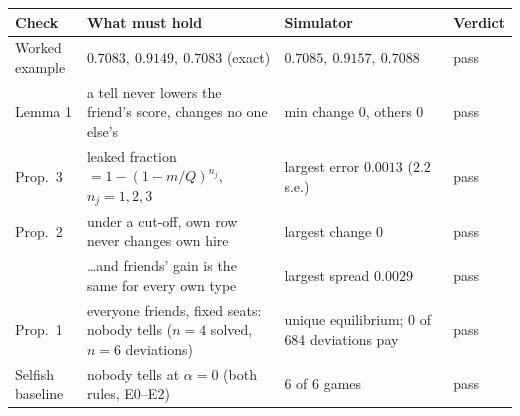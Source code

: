 \begin{tabular}{@{}llll@{}}
\toprule
Check & What must hold & Simulator & Verdict \\
\midrule
Worked example & $0.7083,\ 0.9149,\ 0.7083$ (exact) & $0.7085,\ 0.9157,\ 0.7088$ & pass \\
Lemma 1 & a tell never lowers the friend's score, changes no one else's & min change $0$, others $0$ & pass \\
Prop.\ 3 & leaked fraction $=1-(1-m/Q)^{n_j}$, $n_j=1,2,3$ & largest error $0.0013$ ($2.2$ s.e.) & pass \\
Prop.\ 2 & under a cut-off, own row never changes own hire & largest change $0$ & pass \\
 & \ldots and friends' gain is the same for every own type & largest spread $0.0029$ & pass \\
Prop.\ 1 & everyone friends, fixed seats: nobody tells ($n{=}4$ solved, $n{=}6$ deviations) & unique equilibrium; 0 of 684 deviations pay & pass \\
Selfish baseline & nobody tells at $\alpha=0$ (both rules, E0--E2) & 6 of 6 games & pass \\
\bottomrule
\end{tabular}
